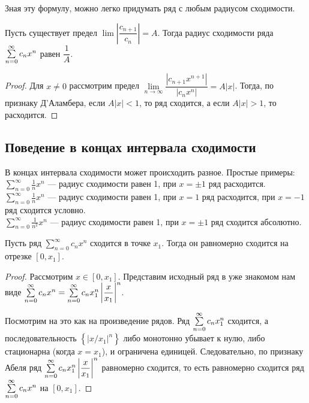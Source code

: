\documentclass[a4paper, 12pt]{article}
\begin{document}
Зная эту формулу, можно легко придумать ряд с любым радиусом сходимости.

\begin{Statement}
Пусть существует предел $\lim \left|\dfrac{c_{n+1}}{c_n}  \right| = A$. Тогда радиус сходимости ряда $\sum\limits_{n=0}^{\infty} c_nx^n$ равен $\dfrac{1}{A}$.
\end{Statement}

\begin{proof}
Для $x \neq 0$ рассмотрим предел $\lim\limits_{n \to \infty} \dfrac{|c_{n+1}x^{n+1}|}{|c_nx^n|} = A|x|$. Тогда, по признаку Д'Аламбера, если $A|x| < 1$, то ряд сходится, а если $A|x| > 1$, то расходится.
\end{proof}

\subsection{Поведение в концах интервала сходимости}

В концах интервала сходимости может происходить разное.
Простые примеры:
\\$\sum\limits_{n = 0}^{\infty}\frac{1}{n} x^n$ --- радиус сходимости равен 1, при $x= \pm1$ ряд расходится.
\\$\sum\limits_{n = 0}^{\infty}\frac{1}{n} x^n$ --- радиус сходимости равен 1, при $x= 1$ ряд расходится, при $x = -1$ ряд сходится условно.
\\$\sum\limits_{n = 0}^{\infty}\frac{1}{n^2} x^n$ --- радиус сходимости равен 1, при $x= \pm 1$ ряд сходится абсолютно.



\begin{Theorem} [Абеля II]
	Пусть ряд $\sum\limits_{n = 0}^{\infty}c_n x^n$ сходится в точке $x_1$. Тогда он равномерно сходится на отрезке $[0, x_1]$.
\end{Theorem}

\begin{proof}
Рассмотрим $x \in [0, x_1]$. Представим исходный ряд в уже знакомом нам виде $\sum\limits_{n=0}^{\infty} c_n x^n = \sum\limits_{n=0}^{\infty} c_n x_1^n \left|\dfrac{x}{x_1} \right|^n$.

Посмотрим на это как на произведение рядов. Ряд $\sum\limits_{n=0}^{\infty} c_nx_1^n$ сходится, а последовательность $\left\{\left|x/x_1\right|^n \right\}$ либо монотонно убывает к нулю, либо стационарна (когда $x=x_1$), и ограничена единицей. Следовательно, по признаку Абеля ряд $\sum\limits_{n=0}^{\infty} c_n x_1^n \left|\dfrac{x}{x_1} \right|^n$ равномерно сходится, то есть равномерно сходится ряд $\sum\limits_{n=0}^{\infty} c_nx^n$ на $[0, x_1]$.
\end{proof}
\end{document}
